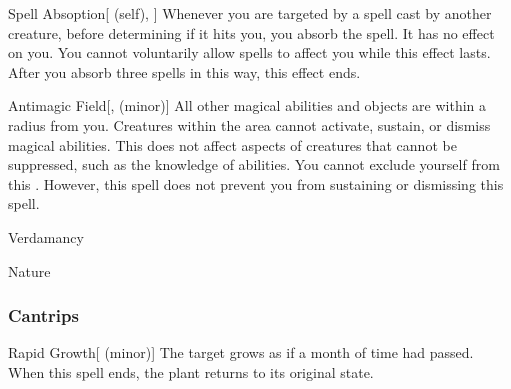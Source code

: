 \lowercase{\hypertarget{spell:Spell Absoption}{}}\label{spell:Spell Absoption}
\begin{attuneability}[Rank 7]{\hypertarget{spell:Spell Absoption}{Spell Absoption}}[ (self), ]
Whenever you are targeted by a spell cast by another creature, before determining if it hits you, you absorb the spell.
It has no effect on you.
You cannot voluntarily allow spells to affect you while this effect lasts.
After you absorb three spells in this way, this effect ends.
\end{attuneability}
\vspace{0.25em}



\lowercase{\hypertarget{spell:Antimagic Field}{}}\label{spell:Antimagic Field}
\begin{freeability}[Rank 8]{\hypertarget{spell:Antimagic Field}{Antimagic Field}}[,  (minor)]
All other magical abilities and objects are  within a \areamed radius  from you.
Creatures within the area cannot activate, sustain, or dismiss magical abilities.
This does not affect aspects of creatures that cannot be suppressed, such as the knowledge of abilities.
You cannot exclude yourself from this .
However, this spell does not prevent you from sustaining or dismissing this spell.
\end{freeability}
\vspace{0.25em}


\newpage
\begin{spellsection}{Verdamancy}

\begin{spellheader}
\end{spellheader}


 Nature

\subsubsection{Cantrips}


\begin{freeability}{Rapid Growth}[ (minor)]
The target grows as if a month of time had passed.
When this spell ends, the plant returns to its original state.
\end{freeability}

\end{spellsection}


